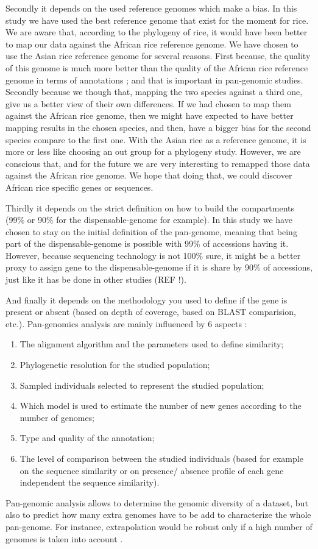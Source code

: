 \documentclass[10pt,letterpaper]{article}
\begin{document}
Secondly it depends on the used reference genomes which make a bias. In this study we have used the best reference genome that exist for the moment for rice. We are aware that, according to the phylogeny of rice, it would have been better to map our data against the African rice reference genome. We have chosen to use the Asian rice reference genome for several reasons. First because, the quality of this genome is much more better than the quality of the African rice reference genome in terms of annotations ; and that is important in pan-genomic studies. Secondly because we though that, mapping the two species against a third one, give us a better view of their own differences. If we had chosen to map them against the African rice genome, then we might have expected to have better mapping results in the chosen species, and then, have a bigger bias for the second species compare to the first one. With the Asian rice as a reference genome, it is more or less like choosing an out group for a phylogeny study. However, we are conscious that, and for the future we are very interesting to remapped those data against the African rice genome. We hope that doing that, we could discover African rice specific genes or sequences. 

Thirdly it depends on the strict definition on how to build the compartments (99\% or 90\% for the dispensable-genome for example). In this study we have chosen to stay on the initial definition of the pan-genome, meaning that being part of the dispensable-genome is possible with 99\% of accessions having it. However, because sequencing technology is not 100\% sure, it might be a better proxy to assign gene to the dispensable-genome if it is share by 90\% of accessions, just like it has be done in other studies (REF !).

And finally it depends on the methodology you used to define if the gene is present or absent (based on depth of coverage, based on BLAST comparision, etc.). Pan-genomics analysis are mainly influenced by 6 aspects \cite{Vernikos2015}:
\begin{enumerate}
\item The alignment algorithm and the parameters used to define similarity;
\item Phylogenetic resolution for the studied population;
\item Sampled individuals selected to represent the studied population;
\item Which model is used to estimate the number of new genes according to the number of genomes;
\item Type and quality of the annotation;
\item The level of comparison between the studied individuals (based for example on the sequence similarity or on presence/ absence profile of each gene independent the sequence similarity).
\end{enumerate}
Pan-genomic analysis allows to determine the genomic diversity of a dataset, but also to predict how many extra genomes have to be add to characterize the whole pan-genome. For instance, extrapolation would be robust only if a high number of genomes is taken into account \cite{Vernikos2015}.\\
\end{document}
